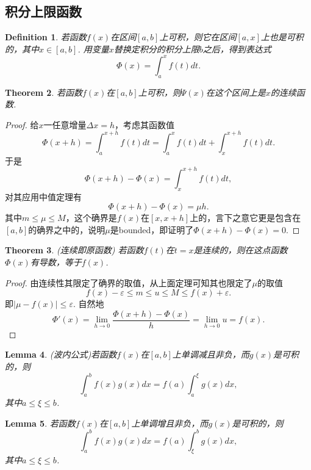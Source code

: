 \documentclass{article}
\newtheorem{theorem}{Theorem}[section]
\newtheorem{lemma}[theorem]{Lemma}
\newtheorem{definition}[theorem]{Definition}
\begin{document}
\subsection{积分上限函数}

\begin{definition}
\rm 若函数$f(x)$在区间$[a,b]$上可积，则它在区间$[a,x]$上也是可积的，其中$x \in [a,b]$. 用变量$x$替换定积分的积分上限$b$之后，得到表达式
$$
\Phi(x) = \int_a^x f(t)dt.
$$
\end{definition}

\begin{theorem}
\rm 若函数$f(x)$在$[a,b]$上可积，则$\Psi(x)$在这个区间上是$x$的连续函数.
\end{theorem}

\begin{proof}
给$x$一任意增量$\Delta x = h$，考虑其函数值
$$
\Phi(x+h) = \int_a^{x+h} f(t)dt = \int_a^x f(t)dt  + \int_x^{x+h} f(t)dt.
$$
于是
$$
\Phi(x+h) - \Phi(x) = \int_x^{x+h} f(t)dt,
$$
对其应用中值定理有
$$
\Phi(x+h) - \Phi(x)  = \mu h.
$$
其中$m \leq \mu \leq M$，这个确界是$f(x)$在$[x,x+h]$上的，言下之意它更是包含在$[a,b]$的确界之中的，说明$\mu$是bounded，即证明了$\Phi(x+h) - \Phi(x) = 0$.
\end{proof}

\begin{theorem}
\rm {\color{red} (连续即原函数)} 若函数$f(t)$在$t=x$是连续的，则在这点函数$\Phi(x)$有导数，等于$f(x)$.
\end{theorem}

\begin{proof}
由连续性其限定了确界的取值，从上面定理可知其也限定了$\mu$的取值
$$
f(x) - \varepsilon \leq m  \leq u \leq M \leq f(x) + \varepsilon. 
$$
即$|\mu-f(x)| \leq \varepsilon$. 自然地
$$
\Phi'(x) = \lim\limits_{h \rightarrow 0} \frac{\Phi(x+h)-\Phi(x)}{h} = \lim\limits_{h \rightarrow 0} u = f(x).
$$
\end{proof}

\begin{lemma}
\rm {\color{red} (波内公式)}若函数$f(x)$在$[a,b]$上单调减且非负，而$g(x)$是可积的，则
$$
\int_a^b f(x)g(x)dx = f(a) \int_a^\xi g(x)dx,
$$
其中$a \leq \xi \leq b$.
\end{lemma}

\begin{lemma}
\rm 若函数$f(x)$在$[a,b]$上单调增且非负，而$g(x)$是可积的，则
$$
\int_a^b f(x)g(x)dx = f(a) \int_\xi^b g(x)dx,
$$
其中$a \leq \xi \leq b$.
\end{lemma}
\end{document}

